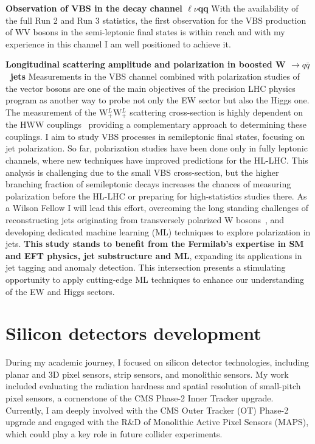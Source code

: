 {\begin{flushleft}
\textbf{Observation of VBS in the decay channel $\ell\nu$qq} With the availability of the full Run 2 and Run 3 statistics, the first observation for the VBS production of WV bosons in the semi-leptonic final states is within reach and with my experience in this channel I am well positioned to achieve it.

\textbf{Longitudinal scattering amplitude and polarization in boosted W $\to q\bar{q}$ \ jets}
Measurements in the VBS channel combined with polarization studies of the vector bosons are one of the main objectives of the precision LHC physics program as another way to probe not only the EW sector but also the Higgs one.
The measurement of the  W$^L_+$W$^L_+$ scattering cross-section is highly dependent on the HWW couplings~\cite{[3]} providing a complementary approach to determining these couplings.
I aim to study VBS processes in semileptonic final states, focusing on jet polarization. So far, polarization studies have been done only in fully leptonic channels, where new techniques have improved predictions for the HL-LHC. This analysis is challenging due to the small VBS cross-section, but the higher branching fraction of semileptonic decays increases the chances of measuring polarization before the HL-LHC or preparing for high-statistics studies there. As a Wilson Fellow I will lead this effort, overcoming the long standing challenges of reconstructing jets originating from transversely polarized W bosons~\cite{[4]}, and developing dedicated machine learning (ML) techniques to explore polarization in jets.
\textbf{This study stands to benefit from the Fermilab’s expertise in SM and EFT physics, jet substructure and ML}, expanding its applications in jet tagging and anomaly detection. This intersection presents a stimulating opportunity to apply cutting-edge ML techniques to enhance our understanding of the EW and Higgs sectors.


 
\vskip 5pt
\section{Silicon detectors development}
\vskip 5pt
During my academic journey, I focused on silicon detector technologies, including planar and 3D pixel sensors, strip sensors, and monolithic sensors. My work included evaluating the radiation hardness and spatial resolution of small-pitch pixel sensors, a cornerstone of the CMS Phase-2 Inner Tracker upgrade. Currently, I am deeply involved with the CMS Outer Tracker  (OT) Phase-2 upgrade and engaged with the R\&D of Monolithic Active Pixel Sensors (MAPS), which could play a key role in future collider experiments.
\vskip 5pt 

\end{flushleft}}

